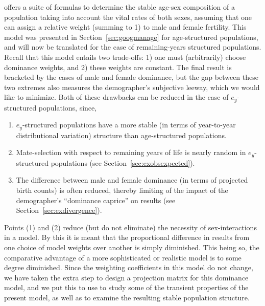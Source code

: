  \FloatBarrier
 \label{sec:ex2sexdomweights}
\citet{goodman1967age} offers a suite of
formulas to determine the stable age-sex composition of a population taking into
account the vital rates of both sexes, assuming that one can assign a relative
weight (summing to 1) to male and female fertility. This model was presented in
Section~\ref{sec:googmanage} for age-structured populations, and will now be
translated for the case of remaining-years structured populations. Recall that
this model entails two trade-offs: 1) one must (arbitrarily) choose dominance
weights, and 2) these weights are constant. The final result 
is bracketed by the cases of male and female dominance, but the gap between
these two extremes also measures the demographer's subjective leeway, which we would like to
minimize. Both of these drawbacks can be reduced in the case of $e_y$-structured
populations, since,
\begin{enumerate}
  \item $e_y$-structured populations have a more stable (in terms of
  year-to-year distributional variation) structure than age-structured
  populations.
  \item Mate-selection with respect to remaining years of
life is nearly random in $e_y$-structured populations (see
Section~\ref{sec:exobsexpected}).
  \item The difference between male and female dominance (in terms of projected
birth counts) is often reduced, thereby limiting of the impact of the
demographer's ``dominance caprice'' on results (see
Section~\ref{sec:exdivergence}).
\end{enumerate}
Points (1) and (2) reduce (but do
not eliminate) the necessity of sex-interactions in a model. By this it is meant
that the proportional difference in results from one choice of model weights
over another is simply diminished. This being so, the comparative advantage of a
more sophisticated or realistic model is to some degree diminished. Since the
weighting coefficients in this model do not change, we have taken the extra step
to design a projection matrix for this dominance model, and we put this to use
to study some of the transient properties of the present model, as well as to
examine the resulting stable population structure.
